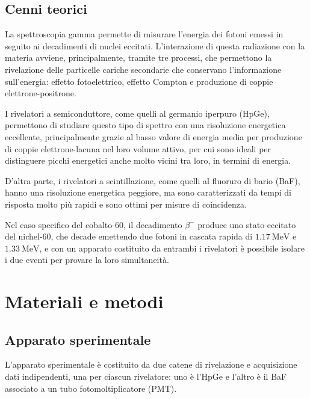 \documentclass{article}
\begin{document}
        \subsection*{Cenni teorici}
            La spettroscopia gamma permette di misurare l'energia dei fotoni emessi in seguito ai decadimenti di nuclei eccitati. L'interazione di questa radiazione con la materia avviene, principalmente, tramite tre processi, che permettono la rivelazione delle particelle cariche secondarie che conservano l'informazione sull'energia: effetto fotoelettrico, effetto Compton e produzione di coppie elettrone-positrone.

            I rivelatori a semiconduttore, come quelli al germanio iperpuro (HpGe), permettono di studiare questo tipo di spettro con una risoluzione energetica eccellente, principalmente grazie al basso valore di energia media per produzione di coppie elettrone-lacuna nel loro volume attivo, per cui sono ideali per distinguere picchi energetici anche molto vicini tra loro, in termini di energia.

            D'altra parte, i rivelatori a scintillazione, come quelli al fluoruro di bario (BaF), hanno una risoluzione energetica peggiore, ma sono caratterizzati da tempi di risposta molto più rapidi e sono ottimi per misure di coincidenza.

            Nel caso specifico del cobalto-60, il decadimento $\beta^{-}$ produce uno stato eccitato del nichel-60, che decade emettendo due fotoni in cascata rapida di $\SI{1.17}{\mega\electronvolt}$ e $\SI{1.33}{\mega\electronvolt}$, e con un apparato costituito da entrambi i rivelatori è possibile isolare i due eventi per provare la loro simultaneità.
            
    \section*{Materiali e metodi}
        \subsection*{Apparato sperimentale}
            L'apparato sperimentale è costituito da due catene di rivelazione e acquisizione dati indipendenti, una per ciascun rivelatore: uno è l'HpGe e l'altro è il BaF associato a un tubo fotomoltiplicatore (PMT).
\end{document}
